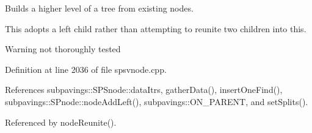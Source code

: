 \-Builds a higher level of a tree from existing nodes. 

\-This adopts a left child rather than attempting to reunite two children into this. \begin{DoxyWarning}{\-Warning}
not thoroughly tested 
\end{DoxyWarning}


\-Definition at line 2036 of file spsvnode.\-cpp.



\-References subpavings\-::\-S\-P\-Snode\-::data\-Itrs, gather\-Data(), insert\-One\-Find(), subpavings\-::\-S\-Pnode\-::node\-Add\-Left(), subpavings\-::\-O\-N\-\_\-\-P\-A\-R\-E\-N\-T, and set\-Splits().



\-Referenced by node\-Reunite().


